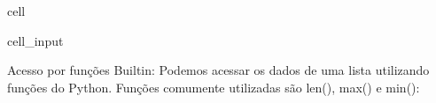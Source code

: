 \documentclass[letterpaper,10pt,english]{jupyterBook}
\begin{document}
\begin{sphinxuseclass}{cell}\begin{sphinxVerbatimInput}

\begin{sphinxuseclass}{cell_input}
\begin{sphinxVerbatim}[commandchars=\\\{\}]
   
\end{sphinxVerbatim}

\end{sphinxuseclass}\end{sphinxVerbatimInput}

\end{sphinxuseclass}
\sphinxAtStartPar
Acesso por funções Built\sphinxhyphen{}in:
Podemos acessar os dados de uma lista utilizando funções do Python. Funções comumente utilizadas são len(), max() e min():
\end{document}
